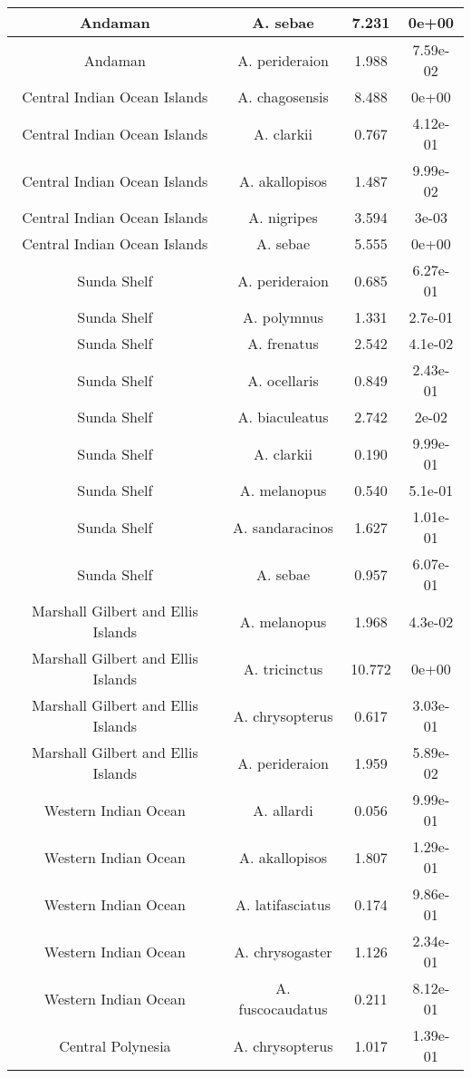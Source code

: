 \begin{table}[!h]
\begin{tabular}[t]{c|c|c|c}
Andaman & A. sebae & 7.231 & 0e+00\\
\hline
Andaman & A. perideraion & 1.988 & 7.59e-02\\
\hline
Central Indian Ocean Islands & A. chagosensis & 8.488 & 0e+00\\
\hline
Central Indian Ocean Islands & A. clarkii & 0.767 & 4.12e-01\\
\hline
Central Indian Ocean Islands & A. akallopisos & 1.487 & 9.99e-02\\
\hline
Central Indian Ocean Islands & A. nigripes & 3.594 & 3e-03\\
\hline
Central Indian Ocean Islands & A. sebae & 5.555 & 0e+00\\
\hline
Sunda Shelf & A. perideraion & 0.685 & 6.27e-01\\
\hline
Sunda Shelf & A. polymnus & 1.331 & 2.7e-01\\
\hline
Sunda Shelf & A. frenatus & 2.542 & 4.1e-02\\
\hline
Sunda Shelf & A. ocellaris & 0.849 & 2.43e-01\\
\hline
Sunda Shelf & A. biaculeatus & 2.742 & 2e-02\\
\hline
Sunda Shelf & A. clarkii & 0.190 & 9.99e-01\\
\hline
Sunda Shelf & A. melanopus & 0.540 & 5.1e-01\\
\hline
Sunda Shelf & A. sandaracinos & 1.627 & 1.01e-01\\
\hline
Sunda Shelf & A. sebae & 0.957 & 6.07e-01\\
\hline
Marshall  Gilbert and Ellis Islands & A. melanopus & 1.968 & 4.3e-02\\
\hline
Marshall  Gilbert and Ellis Islands & A. tricinctus & 10.772 & 0e+00\\
\hline
Marshall  Gilbert and Ellis Islands & A. chrysopterus & 0.617 & 3.03e-01\\
\hline
Marshall  Gilbert and Ellis Islands & A. perideraion & 1.959 & 5.89e-02\\
\hline
Western Indian Ocean & A. allardi & 0.056 & 9.99e-01\\
\hline
Western Indian Ocean & A. akallopisos & 1.807 & 1.29e-01\\
\hline
Western Indian Ocean & A. latifasciatus & 0.174 & 9.86e-01\\
\hline
Western Indian Ocean & A. chrysogaster & 1.126 & 2.34e-01\\
\hline
Western Indian Ocean & A. fuscocaudatus & 0.211 & 8.12e-01\\
\hline
Central Polynesia & A. chrysopterus & 1.017 & 1.39e-01\\

\end{tabular}
\end{table}

